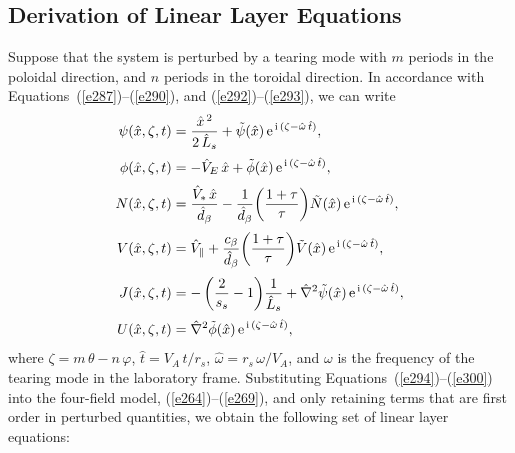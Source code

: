 \documentclass[notitlepage,12pt]{article}
\begin{document}
\subsection{Derivation of Linear Layer Equations}\label{s5.3}
Suppose that the system is perturbed by a tearing mode with $m$ periods in the poloidal direction, and
$n$ periods in the toroidal direction. In accordance with Equations~(\ref{e287})--(\ref{e290}), and (\ref{e292})--(\ref{e293}), we can write
\begin{align}
\psi(\hat{x},\zeta,t) &= \frac{\hat{x}^{\,2} }{2\,\hat{L}_s}+ \tilde{\psi}(\hat{x})\,{\rm e}^{\,{\rm i}\,(\zeta-\hat{\omega}\,\hat{t})},\\[0.5ex]
\phi(\hat{x},\zeta,t) &=-\hat{V}_E\,\hat{x}+ \tilde{\phi}(\hat{x})\,{\rm e}^{\,{\rm i}\,(\zeta-\hat{\omega}\,\hat{t})},\\[0.5ex]
N(\hat{x},\zeta,t) &= \frac{\hat{V}_\ast\,\hat{x}}{\hat{d}_\beta}-\frac{1}{\hat{d}_\beta}\!\left(\frac{1+\tau}{\tau}\right)\!\tilde{N}(\hat{x})\,{\rm e}^{\,{\rm i}\,(\zeta-\hat{\omega}\,\hat{t})},\\[0.5ex]
V(\hat{x},\zeta,t) &= \hat{V}_\parallel + \frac{c_\beta}{\hat{d}_\beta}\!\left(\frac{1+\tau}{\tau}\right)\!\tilde{V}(\hat{x})\,{\rm e}^{\,{\rm i}\,(\zeta-\hat{\omega}\,\hat{t})},\\[0.5ex]
J(\hat{x},\zeta,t) &=-\left(\frac{2}{s_s}-1\right)\!\frac{1}{\hat{L}_s}+ \hat{\nabla}^2\tilde{\psi}(\hat{x})\,{\rm e}^{\,{\rm i}\,(\zeta-\hat{\omega}\,\hat{t})},\\[0.5ex]
U(\hat{x},\zeta,t) &=  \hat{\nabla}^2\tilde{\phi}(\hat{x})\,{\rm e}^{\,{\rm i}\,(\zeta-\hat{\omega}\,\hat{t})},\label{e300}
\end{align}
where $\zeta=m\,\theta-n\,\varphi$, $\hat{t}=V_A\,t/r_s$, $\hat{\omega}=r_s\,\omega/V_A$, and $\omega$ is the frequency of the tearing mode in the laboratory frame. 
Substituting Equations~(\ref{e294})--(\ref{e300}) into the four-field model, (\ref{e264})--(\ref{e269}), and only retaining terms that
are first order in perturbed quantities, we obtain the following set of linear layer equations:
\end{document}
